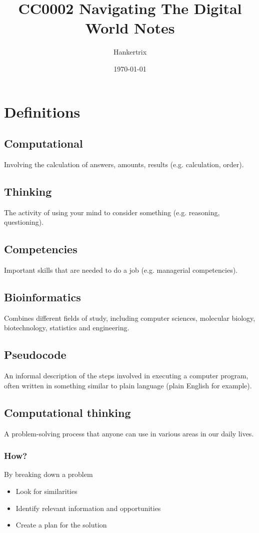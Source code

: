 \documentclass[11pt]{article}
\author{Hankertrix}
\date{\today}
\title{CC0002 Navigating The Digital World Notes}
\begin{document}
\maketitle
\setcounter{tocdepth}{2}
\tableofcontents \clearpage\section{Definitions}
\label{sec:orgd51aad1}

\subsection{Computational}
\label{sec:org9ad92ee}
Involving the calculation of answers, amounts, results (e.g. calculation, order).
\subsection{Thinking}
\label{sec:orgc4c5e74}
The activity of using your mind to consider something (e.g. reasoning, questioning).
\subsection{Competencies}
\label{sec:org2edc774}
Important skills that are needed to do a job (e.g. managerial competencies).
\subsection{Bioinformatics}
\label{sec:orge87347a}
Combines different fields of study, including computer sciences, molecular biology, biotechnology, statistics and engineering.
\subsection{Pseudocode}
\label{sec:org90640d4}
An informal description of the steps involved in executing a computer program, often written in something similar to plain language (plain English for example).
\subsection{Computational thinking}
\label{sec:org36c10a7}
A problem-solving process that anyone can use in various areas in our daily lives.
\subsubsection{How?}
\label{sec:org01c12ed}
By breaking down a problem
\begin{itemize}
\item Look for similarities
\item Identify relevant information and opportunities
\item Create a plan for the solution
\end{itemize}
\end{document}
